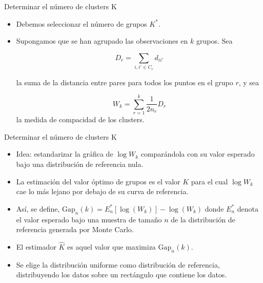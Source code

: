 \documentclass{beamer}
\begin{document}

\begin{frame}{Determinar el número de clusters K}
  \begin{itemize}
    \item Debemos seleccionar el número de grupos $K^\ast$.
    \item Supongamos que se han agrupado las observaciones en $k$ grupos. Sea

    \begin{equation}
    D_r = \sum_{i,i' \in C_{r}} d_{ii'}
    \end{equation}

    la suma de la distancia entre pares para todos los puntos en el grupo $r$, y sea

    \begin{equation}
    W_k = \sum_{r=1}^k \dfrac{1}{2n_{r}}D_{r}
    \end{equation}
    la medida de compacidad de los clusters.
  \end{itemize}
\end{frame}

\begin{frame}{Determinar el número de clusters K}
\begin{itemize}
  \item Idea: estandarizar la gráfica de $\log{W_k}$ comparándola con su valor esperado bajo una distribución de referencia nula. 
  \item La estimación del valor óptimo de grupos es el valor $K$ para el cual $\log{W_{k}}$ cae lo más lejano por debajo de su curva de referencia.
  \item Así, se define, $\mbox{Gap}_{n}(k)=E^\ast_{n} \left[\log(W_{k}) \right]-\log(W_{k})$ donde $E^\ast_{n}$ denota el valor esperado bajo una muestra de tamaño $n$ de la distribución de referencia generada por Monte Carlo.
  \item El estimador $\hat{K}$  es aquel valor que maximiza $\mbox{Gap}_{n}(k)$.
  \item Se elige la distribución uniforme como distribución de referencia, distribuyendo los datos sobre un rectángulo que contiene los datos.
  \end{itemize} 
\end{frame}
\end{document}
